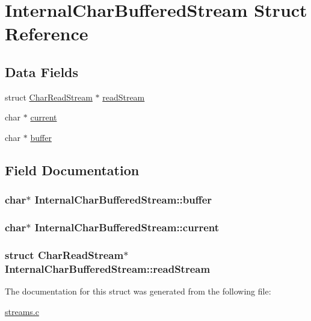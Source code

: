 \hypertarget{structInternalCharBufferedStream}{\section{Internal\+Char\+Buffered\+Stream Struct Reference}
\label{structInternalCharBufferedStream}
}
\subsection*{Data Fields}
\begin{DoxyCompactItemize}
\item 
struct \hyperlink{structCharReadStream}{Char\+Read\+Stream} $\ast$ \hyperlink{structInternalCharBufferedStream_a32e4d2a260634ec617c14bf5d6f72acf}{read\+Stream}
\item 
char $\ast$ \hyperlink{structInternalCharBufferedStream_ad17b094601644ac0304c5e90103086ba}{current}
\item 
char $\ast$ \hyperlink{structInternalCharBufferedStream_a31b7899decad846f4f61aafe5231237e}{buffer}
\end{DoxyCompactItemize}


\subsection{Field Documentation}
\hypertarget{structInternalCharBufferedStream_a31b7899decad846f4f61aafe5231237e}{
\subsubsection[{buffer}]{\setlength{\rightskip}{0pt plus 5cm}char$\ast$ Internal\+Char\+Buffered\+Stream\+::buffer}}\label{structInternalCharBufferedStream_a31b7899decad846f4f61aafe5231237e}
\hypertarget{structInternalCharBufferedStream_ad17b094601644ac0304c5e90103086ba}{
\subsubsection[{current}]{\setlength{\rightskip}{0pt plus 5cm}char$\ast$ Internal\+Char\+Buffered\+Stream\+::current}}\label{structInternalCharBufferedStream_ad17b094601644ac0304c5e90103086ba}
\hypertarget{structInternalCharBufferedStream_a32e4d2a260634ec617c14bf5d6f72acf}{
\subsubsection[{read\+Stream}]{\setlength{\rightskip}{0pt plus 5cm}struct {\bf Char\+Read\+Stream}$\ast$ Internal\+Char\+Buffered\+Stream\+::read\+Stream}}\label{structInternalCharBufferedStream_a32e4d2a260634ec617c14bf5d6f72acf}


The documentation for this struct was generated from the following file\+:\begin{DoxyCompactItemize}
\item 
\hyperlink{streams_8c}{streams.\+c}\end{DoxyCompactItemize}

